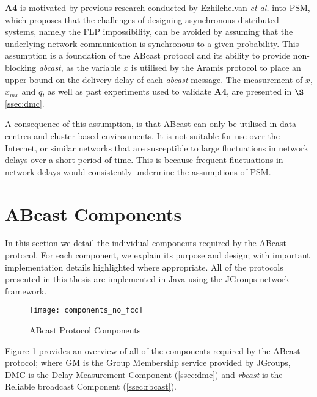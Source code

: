 \begin{description}
    	\textbf{A4} is motivated by previous research conducted by Ezhilchelvan \emph{et al.} \citep{Ezhilchelvan:2010:LPR:1773912.1773927} into PSM, which proposes that the challenges of designing asynchronous distributed systems, namely the FLP impossibility, can be avoided by assuming that the underlying network communication is synchronous to a given probability.  This assumption is a foundation of the \textsf{ABcast} protocol and its ability to provide non-blocking \emph{abcast}, as the variable $x$ is utilised by the \textsf{Aramis} protocol to place an upper bound on the delivery delay of each \emph{abcast} message.  The measurement of $x$, $x_{mx}$ and $q$, as well as past experiments used to validate \textbf{A4}, are presented in $\S$ \ref{ssec:dmc}.  	
    	
    	A consequence of this assumption, is that \textsf{ABcast} can only be utilised in data centres and cluster-based environments.  It is not suitable for use over the Internet, or similar networks that are susceptible to large fluctuations in network delays over a short period of time.  This is because frequent fluctuations in network delays would consistently undermine the assumptions of PSM.  
	\end{description}
	
\section{ABcast Components}
In this section we detail the individual components required by the \textsf{ABcast} protocol.  For each component, we explain its purpose and design; with important implementation details highlighted where appropriate.  All of the protocols presented in this thesis are implemented in Java using the JGroups \citep{JGroups} network framework.  

    \begin{figure}[!h] 
        \centering    
         \texttt{[image: components\_no\_fcc]}
         \caption[\textsf{ABcast} Protocol Components Overview]{\textsf{ABcast} Protocol Components}
         \label{fig:abcast_components}
    \end{figure}
    
   Figure \ref{fig:abcast_components} provides an overview of all of the components required by the \textsf{ABcast} protocol; where GM is the Group Membership service provided by JGroups, DMC is the Delay Measurement Component (\ref{ssec:dmc}) and \emph{rbcast} is the Reliable broadcast Component (\ref{ssec:rbcast}).  

